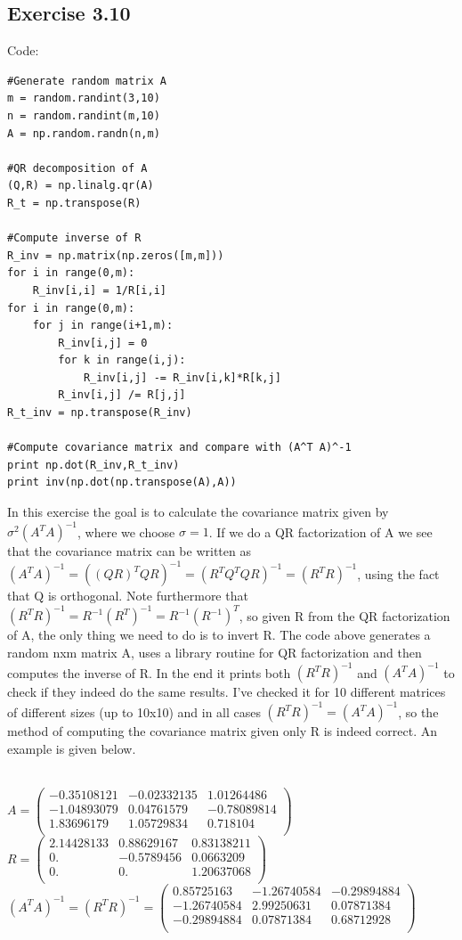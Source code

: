 \documentclass[10pt,a4paper]{article}
\begin{document}
\subsection*{Exercise 3.10}
\lstset{language=Python}
Code:
\begin{lstlisting}
#Generate random matrix A
m = random.randint(3,10)
n = random.randint(m,10)
A = np.random.randn(n,m)

#QR decomposition of A
(Q,R) = np.linalg.qr(A)
R_t = np.transpose(R)

#Compute inverse of R
R_inv = np.matrix(np.zeros([m,m]))
for i in range(0,m):
    R_inv[i,i] = 1/R[i,i]
for i in range(0,m):
    for j in range(i+1,m):
        R_inv[i,j] = 0
        for k in range(i,j):
            R_inv[i,j] -= R_inv[i,k]*R[k,j]
        R_inv[i,j] /= R[j,j]
R_t_inv = np.transpose(R_inv)

#Compute covariance matrix and compare with (A^T A)^-1
print np.dot(R_inv,R_t_inv)
print inv(np.dot(np.transpose(A),A))
\end{lstlisting}

\noindent In this exercise the goal is to calculate the covariance matrix given by $\sigma^{2}(A^{T}A)^{-1}$, where we choose $\sigma = 1$. If we do a QR factorization of A we see that the covariance matrix can be written as $(A^{T} A)^{-1} = ((QR)^{T} QR)^{-1} = (R^{T}Q^{T}QR)^{-1} = (R^{T}R)^{-1}$, using the fact that Q is orthogonal. Note furthermore that $(R^{T}R)^{-1} = R^{-1} (R^{T})^{-1} = R^{-1} (R^{-1})^{T}$, so given R from the QR factorization of A, the only thing we need to do is to invert R. The code above generates a random nxm matrix A, uses a library routine for QR factorization and then computes the inverse of R. In the end it prints both $(R^{T}R)^{-1}$ and $(A^{T}A)^{-1}$ to check if they indeed do the same results. I've checked it for 10 different matrices of different sizes (up to 10x10) and in all cases $(R^{T}R)^{-1} = (A^{T}A)^{-1}$, so the method of computing the covariance matrix given only R is indeed correct. An example is given below.\\
\\
\begin{center}
$A = 
\begin{pmatrix}
-0.35108121&-0.02332135&1.01264486\\
-1.04893079&0.04761579&-0.78089814\\
1.83696179&1.05729834&0.718104\\
\end{pmatrix}
$
\\
$R = 
\begin{pmatrix}
2.14428133&0.88629167&0.83138211\\
0.&-0.5789456&0.0663209\\
0.&0.&1.20637068\\
\end{pmatrix}
$
\\
$(A^{T}A)^{-1} = (R^{T}R)^{-1} = 
\begin{pmatrix}
0.85725163&-1.26740584&-0.29894884\\
-1.26740584&2.99250631&0.07871384\\
-0.29894884&0.07871384&0.68712928\\
\end{pmatrix}
$
\end{center}
\end{document}
